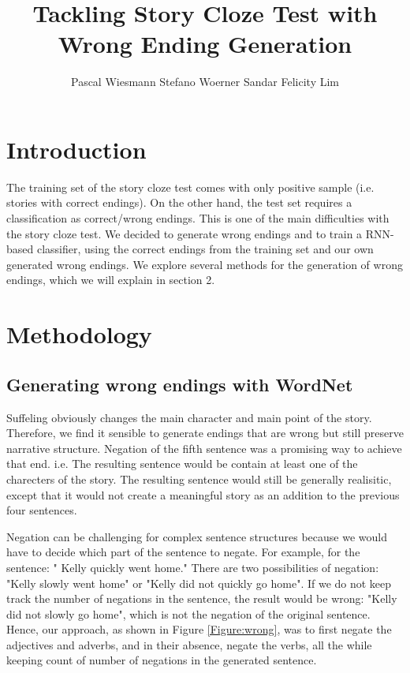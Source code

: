 \documentclass{article}
\title{Tackling Story Cloze Test with Wrong Ending Generation}
\author{Pascal Wiesmann \qquad Stefano Woerner \qquad Sandar Felicity Lim}
\begin{document}

\maketitle


\section{Introduction}

The training set of the story cloze test comes with only positive sample (i.e. stories with correct endings). On the other hand, the test set requires a classification as correct/wrong endings. This is one of the main difficulties with the story cloze test. We decided to generate wrong endings and to train a RNN-based classifier, using the correct endings from the training set and our own generated wrong endings. We explore several methods for the generation of wrong endings, which we will explain in section 2.

\section{Methodology}
\subsection{Generating wrong endings with WordNet}
Suffeling obviously changes the main character and main point of the story. Therefore, we find it sensible to generate endings that are wrong but still preserve narrative structure. Negation of the fifth sentence was a promising way to achieve that end. i.e. The resulting sentence would be contain at least one of the charecters of the story. The resulting sentence would still be generally realisitic, except that it would not create a meaningful story as an addition to the previous four sentences.


Negation can be challenging for complex sentence structures because we would have to decide which part of the sentence to negate. For example, for the sentence: "
Kelly quickly went home." There are two possibilities of negation: "Kelly slowly went home" or "Kelly did not quickly go home". If we do not keep track the number of negations in the sentence, the result would be wrong: "Kelly did not slowly go home", which is not the negation of the original sentence. Hence, our approach, as shown in  Figure \ref{Figure:wrong}, was to first negate the adjectives and adverbs, and in their absence, negate the verbs, all the while keeping count of number of negations in the generated sentence.
\end{document}
